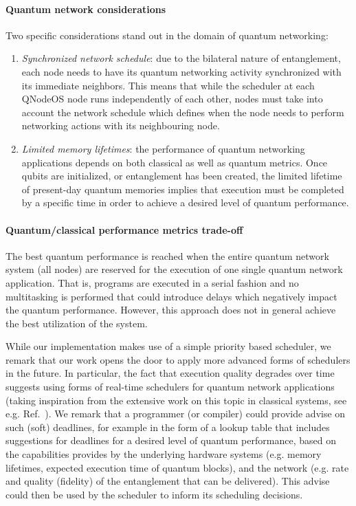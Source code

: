 \paragraph{Quantum network considerations}

Two specific considerations stand out in the domain of quantum networking:
%
\begin{enumerate}
\item \emph{Synchronized network schedule}: due to the bilateral nature of entanglement, each node needs to have its quantum networking activity synchronized with its immediate neighbors. This means that while the scheduler at each \ac{QNodeOS} node runs independently of each other, nodes must take into account the network schedule which defines when the node needs to perform networking actions with its neighbouring node. 
\item \emph{Limited memory lifetimes}: the performance of quantum networking applications depends on both classical as well as quantum metrics. Once qubits are initialized, or entanglement has been created, the limited lifetime of present-day quantum memories implies that execution must be completed by a specific time in order to achieve a desired level of quantum performance. 
\end{enumerate}

\paragraph{Quantum/classical performance metrics trade-off}

The best quantum performance is reached when the entire quantum network system (all nodes) are reserved for the execution of one single quantum network application. That is, programs are executed in a serial fashion and no multitasking is performed that could introduce delays which negatively impact the quantum performance. However, this approach does not in general achieve the best utilization of the system. 

While our implementation makes use of a simple priority based scheduler, we remark that our work opens the door to apply more advanced forms of schedulers in the future. In particular, the fact that execution quality degrades over time suggests using forms of real-time schedulers for quantum network applications (taking inspiration from the extensive work on this topic in classical systems, see e.g. Ref.~\cite{liu_1973_scheduling}).  We remark that a programmer (or compiler) could provide advise on such (soft) deadlines, for example in the form of a lookup table that includes suggestions for deadlines for a desired level of quantum performance, based on the capabilities provides by the underlying hardware systems (e.g. memory lifetimes, expected execution time of quantum blocks), and the network (e.g. rate and quality (fidelity) of the entanglement that can be delivered). This advise could then be used by the scheduler to inform its scheduling decisions.

